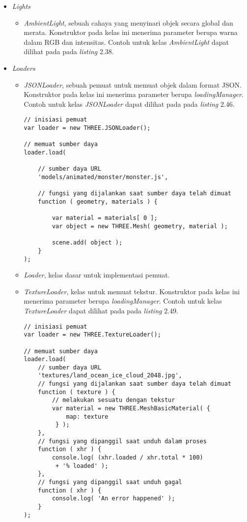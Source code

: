\begin{itemize}
\item \textit{Lights}

	\begin{itemize}
	\item {\it AmbientLight}, sebuah cahaya yang menyinari objek secara global dan merata. Konstruktor pada kelas ini menerima parameter berupa warna dalam RGB dan intensitas. Contoh untuk kelas {\it AmbientLight} dapat dilihat pada pada {\it listing} 2.38.
	\end{itemize}
	
\item \textit{Loaders}

	\begin{itemize}
	\item {\it JSONLoader}, sebuah pemuat untuk memuat objek dalam format JSON. Konstruktor pada kelas ini menerima parameter berupa  {\it loadingManager}. Contoh untuk kelas {\it JSONLoader} dapat dilihat pada pada {\it listing} 2.46.
	
\begin{lstlisting}[caption={Contoh penggunaan kelas {\it JSONLoader}.},captionpos=b]
// inisiasi pemuat
var loader = new THREE.JSONLoader();

// memuat sumber daya
loader.load(

	// sumber daya URL
	'models/animated/monster/monster.js',

	// fungsi yang dijalankan saat sumber daya telah dimuat
	function ( geometry, materials ) {

		var material = materials[ 0 ];
		var object = new THREE.Mesh( geometry, material );

		scene.add( object );
	}
);
\end{lstlisting}

	\item {\it Loader}, kelas dasar untuk implementasi pemuat.
	
	\item {\it TextureLoader}, kelas untuk memuat tekstur. Konstruktor pada kelas ini menerima parameter berupa  {\it loadingManager}. Contoh untuk kelas {\it TextureLoader} dapat dilihat pada pada {\it listing} 2.49.
	
\begin{lstlisting}[caption={Contoh penggunaan kelas {\it TextureLoader}.},captionpos=b]
// inisiasi pemuat
var loader = new THREE.TextureLoader();

// memuat sumber daya
loader.load(
	// sumber daya URL
	'textures/land_ocean_ice_cloud_2048.jpg',
	// fungsi yang dijalankan saat sumber daya telah dimuat
	function ( texture ) {
		// melakukan sesuatu dengan tekstur
		var material = new THREE.MeshBasicMaterial( {
			map: texture
		 } );
	},
	// fungsi yang dipanggil saat unduh dalam proses
	function ( xhr ) {
		console.log( (xhr.loaded / xhr.total * 100)
		 + '% loaded' );
	},
	// fungsi yang dipanggil saat unduh gagal
	function ( xhr ) {
		console.log( 'An error happened' );
	}
);
\end{lstlisting}
	\end{itemize}


\end{itemize}
